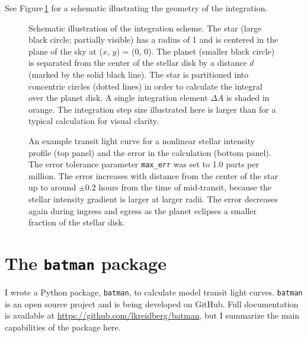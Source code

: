 \documentclass[12pt,preprint]{aastex}
\newcommand*{\blue}{\textcolor{blue}}
\begin{document}
See Figure\,\ref{fig:integration} for a schematic illustrating the geometry of the integration. 

\begin{figure}
\caption{Schematic illustration of the integration scheme. The star (large black circle; partially visible) has a radius of 1 and is centered in the plane of the sky at ($x$, $y$) = (0, 0). The planet (smaller black circle) is separated from the center of the stellar disk by a distance $d$ (marked by the solid black line).  The star is partitioned into concentric circles (dotted lines) in order to calculate the integral over the planet disk.  A single integration element $\Delta A$ is shaded in orange. The integration step size illustrated here is larger than for a typical calculation for visual clarity.}
\label{fig:integration}
\end{figure}

\begin{figure}
\caption{An example transit light curve for a nonlinear stellar intensity profile (top panel) and the error in the calculation (bottom panel).  The error tolerance parameter \texttt{max\_err} was set to 1.0 parts per million.  The error increases with distance from the center of the star up to around $\pm0.2$ hours from the time of mid-transit, because the stellar intensity gradient is larger at larger radii. The error decreases again during ingress and egress as the planet eclipses a smaller fraction of the stellar disk.}
\label{fig:transit}
\end{figure}

\section{The \texttt{batman} package}
I wrote a Python package, \texttt{batman}, to calculate model transit light curves.  \texttt{batman} is an open source project and is being developed on GitHub.  Full documentation is available at \blue{\url{https://github.com/lkreidberg/batman}}, but I summarize the main capabilities of the package here.
\end{document}
